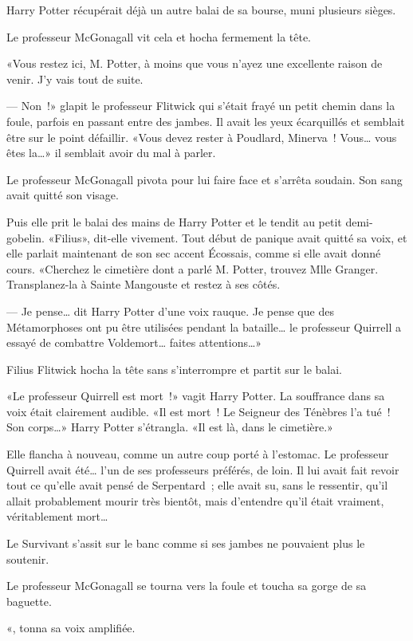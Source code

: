 Harry Potter récupérait déjà un autre balai de sa bourse, muni plusieurs sièges.

Le professeur McGonagall vit cela et hocha fermement la tête.

«Vous restez ici, M. Potter, à moins que vous n'ayez une excellente raison de venir. J'y vais tout de suite.

--- Non~!» glapit le professeur Flitwick qui s'était frayé un petit chemin dans la foule, parfois en passant entre des jambes. Il avait les yeux écarquillés et semblait être sur le point défaillir. «Vous devez rester à Poudlard, Minerva~! Vous… vous êtes la…» il semblait avoir du mal à parler.

Le professeur McGonagall pivota pour lui faire face et s'arrêta soudain. Son sang avait quitté son visage.

Puis elle prit le balai des mains de Harry Potter et le tendit au petit demi-gobelin. «Filius», dit-elle vivement. Tout début de panique avait quitté sa voix, et elle parlait maintenant de son sec accent Écossais, comme si elle avait donné cours. «Cherchez le cimetière dont a parlé M. Potter, trouvez Mlle Granger. Transplanez-la à Sainte Mangouste et restez à ses côtés.

--- Je pense… dit Harry Potter d'une voix rauque. Je pense que des Métamorphoses ont pu être utilisées pendant la bataille… le professeur Quirrell a essayé de combattre Voldemort… faites attentions…»

Filius Flitwick hocha la tête sans s'interrompre et partit sur le balai.

«Le professeur Quirrell est mort~!» vagit Harry Potter. La souffrance dans sa voix était clairement audible. «Il est mort~! Le Seigneur des Ténèbres l'a tué~! Son corps…» Harry Potter s'étrangla. «Il est là, dans le cimetière.»

Elle flancha à nouveau, comme un autre coup porté à l'estomac. Le professeur Quirrell avait été… l'un de ses professeurs préférés, de loin. Il lui avait fait revoir tout ce qu'elle avait pensé de Serpentard~; elle avait su, sans le ressentir, qu'il allait probablement mourir très bientôt, mais d'entendre qu'il était vraiment, véritablement mort…

Le Survivant s'assit sur le banc comme si ses jambes ne pouvaient plus le soutenir.

Le professeur McGonagall se tourna vers la foule et toucha sa gorge de sa baguette.

«, tonna sa voix amplifiée. 

